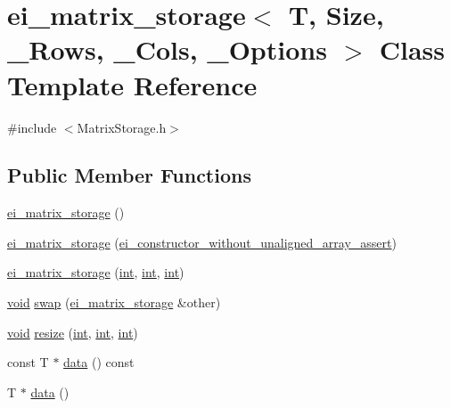 \hypertarget{classei__matrix__storage}{\section{ei\-\_\-matrix\-\_\-storage$<$ T, Size, \-\_\-\-Rows, \-\_\-\-Cols, \-\_\-\-Options $>$ Class Template Reference}
\label{classei__matrix__storage}
}


{\ttfamily \#include $<$Matrix\-Storage.\-h$>$}

\subsection*{Public Member Functions}
\begin{DoxyCompactItemize}
\item 
\hyperlink{classei__matrix__storage_a1ea9014356d72e4e96b1489ab713cebf}{ei\-\_\-matrix\-\_\-storage} ()
\item 
\hyperlink{classei__matrix__storage_a5720c30174b9c3005cfa53966f875e20}{ei\-\_\-matrix\-\_\-storage} (\hyperlink{structei__constructor__without__unaligned__array__assert}{ei\-\_\-constructor\-\_\-without\-\_\-unaligned\-\_\-array\-\_\-assert})
\item 
\hyperlink{classei__matrix__storage_a94c06b13f8bb533f14eacaf5ccce9c9e}{ei\-\_\-matrix\-\_\-storage} (\hyperlink{ioapi_8h_a787fa3cf048117ba7123753c1e74fcd6}{int}, \hyperlink{ioapi_8h_a787fa3cf048117ba7123753c1e74fcd6}{int}, \hyperlink{ioapi_8h_a787fa3cf048117ba7123753c1e74fcd6}{int})
\item 
\hyperlink{group___u_a_v_objects_plugin_ga444cf2ff3f0ecbe028adce838d373f5c}{void} \hyperlink{classei__matrix__storage_a84aa8a96713a0f08900ead67d7bc0607}{swap} (\hyperlink{classei__matrix__storage}{ei\-\_\-matrix\-\_\-storage} \&other)
\item 
\hyperlink{group___u_a_v_objects_plugin_ga444cf2ff3f0ecbe028adce838d373f5c}{void} \hyperlink{classei__matrix__storage_a5a313dac0d74bc7fc8b310618db274ea}{resize} (\hyperlink{ioapi_8h_a787fa3cf048117ba7123753c1e74fcd6}{int}, \hyperlink{ioapi_8h_a787fa3cf048117ba7123753c1e74fcd6}{int}, \hyperlink{ioapi_8h_a787fa3cf048117ba7123753c1e74fcd6}{int})
\item 
const T $\ast$ \hyperlink{classei__matrix__storage_a17a58d6ce17868234280a42f20dccce0}{data} () const 
\item 
T $\ast$ \hyperlink{classei__matrix__storage_ad18fa03bc5600d4d83f3179898f7d26a}{data} ()
\end{DoxyCompactItemize}
